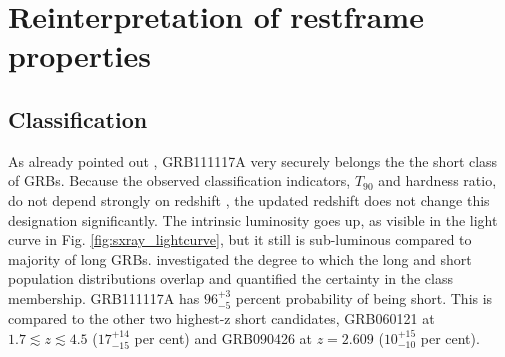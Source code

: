 \documentclass{aa}    %
\begin{document}
\section{Reinterpretation of restframe properties}


\subsection{Classification}

As already pointed out \citep{Margutti2012, Sakamoto2013}, GRB111117A very securely belongs the the short class of GRBs. Because the observed classification indicators, $T_{90}$ and hardness ratio, do not depend strongly on redshift \citep{Littlejohns2013a}, the updated redshift does not change this designation significantly. The intrinsic luminosity goes up, as visible in the light curve in Fig. \ref{fig:sxray_lightcurve}, but it still is sub-luminous compared to majority of long GRBs. 
\citet{Bromberg2013} investigated the degree to which the long and short population distributions overlap and quantified the certainty in the class membership. GRB111117A has $96_{-5}^{+3}$ percent probability of being short. This is compared to the other two highest-z short candidates, GRB060121 \citep{DeUgartePostigo2006, Levan2006} at $1.7 \lesssim z \lesssim 4.5$ ($17_{-15}^{+14}$ per cent) and GRB090426 \citep{Antonelli2009, Levesque2010, Thone2011} at $z = 2.609$ ($10_{-10}^{+15}$ per cent).
\end{document}
